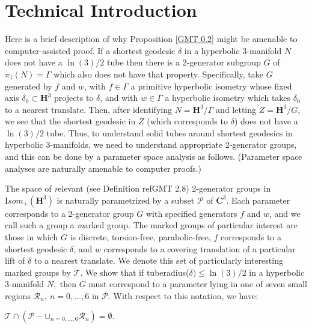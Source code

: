 \chapter{Technical Introduction}\label{Ch. Technical Introduction}
Here is a brief description of why Proposition \ref{GMT 0.2} might be amenable to 
computer-assisted proof.
If a shortest geodesic $\delta$ in a hyperbolic $3$-manifold $N$ does not have 
a $\ln(3)/2$
tube then there is a 2-generator subgroup $G$ of $\pi_1(N) = \Gamma$
which also does not have that property.
Specifically, take $G$ generated by $f$ and $w$,
with $f \in \Gamma$ a primitive hyperbolic isometry
whose fixed axis $\delta_0 \subset {\mathbf H}^3$ projects to $\delta$, and 
with $w \in \Gamma$ a hyperbolic isometry
which takes $\delta_0$ to a nearest translate.
Then, after identifying $N={\mathbf H}^3/\Gamma$ and letting 
$Z={\mathbf H}^3/G$,
we see that the shortest geodesic in $Z$ (which corresponds to $\delta$)
does not have 
a $\ln(3)/2$ tube. 
Thus, to understand solid tubes around shortest geodesics in hyperbolic 
$3$-manifolds, we need to understand appropriate 2-generator groups, and this 
can be done by a parameter space analysis as follows.  (Parameter space 
analyses are naturally amenable to 
computer proofs.)

The space of {\textit relevant} (see
Definition ref{GMT 2.8})  %
2-generator groups 
in ${\mathrm Isom}_+({\mathbf H}^3)$ is naturally
parametrized by a subset ${\mathcal P}$ of ${\mathbf C}^3.$  
Each parameter corresponds to a
2-generator group $G$ with specified generators $f$ and $w$, and we call 
such a group a {\textit marked group}. 
The marked groups of particular interest are those in which $G$ is
discrete, torsion-free, parabolic-free, $f$ corresponds to a shortest
geodesic $\delta$, and $w$ corresponds to a
covering translation of a particular lift of
$\delta$ to a nearest translate.  
We denote this set of particularly interesting marked groups by ${\mathcal T}.$
We show that if tuberadius($\delta) \le \ln(3)/2$ 
in a hyperbolic $3$-manifold $N,$ then 
$G$ must correspond to a parameter lying in one of seven small regions
${\mathcal R}_n,\ n=0,\ldots,6$ 
in ${\mathcal P}$.  
With respect to this notation, we have:

\begin{proposition} \label{GMT 2.19}
${\mathcal T} \cap ({\mathcal P} - \mathbf{\cup}_{n=0,\ldots,6}{\mathcal R}_n) = \emptyset.$
\vfill\end{proposition}


